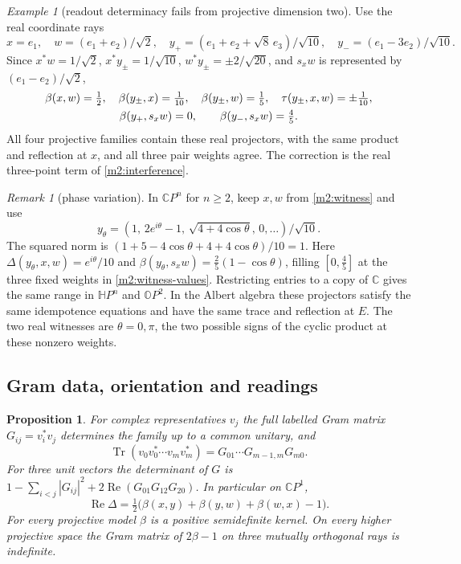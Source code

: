 \documentclass[11pt,reqno]{amsart}
\newtheorem{proposition}[theorem]{Proposition}
\theoremstyle{definition}
\theoremstyle{remark}
\newtheorem{remark}[theorem]{Remark}
\newtheorem{example}[theorem]{Example}
\numberwithin{equation}{section}
\newcommand{\C}{\mathbb{C}}
\newcommand{\HH}{\mathbb{H}}
\newcommand{\re}{\operatorname{Re}}
\begin{document}
\begin{example}[readout determinacy fails from projective dimension two]\label{m2:witness-ex}
Use the real coordinate rays
\begin{equation}\label{m2:witness}
 x=e_1,\quad w=(e_1+e_2)/\sqrt2,\quad y_+=(e_1+e_2+\sqrt8\,e_3)/\sqrt{10},\quad y_-=(e_1-3e_2)/\sqrt{10}.
\end{equation}
Since $x^*w=1/\sqrt2$, $x^*y_\pm=1/\sqrt{10}$, $w^*y_\pm=\pm2/\sqrt{20}$, and $s_xw$ is represented by $(e_1-e_2)/\sqrt2$,
\begin{gather}
 \beta(x,w)=\tfrac12,\quad \beta(y_\pm,x)=\tfrac1{10},\quad \beta(y_\pm,w)=\tfrac15,\quad \tau(y_\pm,x,w)=\pm\tfrac1{10},\notag\\
 \beta(y_+,s_xw)=0,\qquad \beta(y_-,s_xw)=\tfrac45 .\label{m2:witness-values}
\end{gather}
All four projective families contain these real projectors, with the same product and reflection at $x$, and all three pair weights
agree.  The correction is the real three-point term of \eqref{m2:interference}.
\end{example}

\begin{remark}[phase variation]\label{m2:phase-variation}
In $\C P^n$ for $n\ge2$, keep $x,w$ from \eqref{m2:witness} and use
\[
 y_\theta=(1,\,2e^{i\theta}-1,\,\sqrt{4+4\cos\theta},\,0,\dots)/\sqrt{10}.
\]
The squared norm is $(1+5-4\cos\theta+4+4\cos\theta)/10=1$.  Here $\Delta(y_\theta,x,w)=e^{i\theta}/10$ and
$\beta(y_\theta,s_xw)=\tfrac25(1-\cos\theta)$, filling $[0,\tfrac45]$ at the three fixed weights in \eqref{m2:witness-values}.  Restricting entries
to a copy of $\C$ gives the same range in $\HH P^n$ and $\mathbb OP^2$.  In the Albert algebra these projectors satisfy the same idempotence
equations and have the same trace and reflection at $E$.  The two real witnesses are $\theta=0,\pi$, the two possible signs of the cyclic
product at these nonzero weights.
\end{remark}

\subsection{Gram data, orientation and readings}

\begin{proposition}\label{m2:gram}
For complex representatives $v_j$ the full labelled Gram matrix $G_{ij}=v_i^*v_j$ determines the family up to a common unitary, and
\begin{equation}\label{m2:chain}
 \operatorname{Tr}(v_0v_0^*\cdots v_mv_m^*)=G_{01}\cdots G_{m-1,m}G_{m0}.
\end{equation}
For three unit vectors the determinant of $G$ is $1-\sum_{i<j}|G_{ij}|^2+2\re(G_{01}G_{12}G_{20})$.  In particular on $\C P^1$,
\begin{equation}\label{m2:ranktwo}
 \re\Delta=\tfrac12\bigl(\beta(x,y)+\beta(y,w)+\beta(w,x)-1\bigr).
\end{equation}
For every projective model $\beta$ is a positive semidefinite kernel.  On every higher projective space the Gram matrix of $2\beta-1$ on
three mutually orthogonal rays is indefinite.
\end{proposition}
\end{document}
